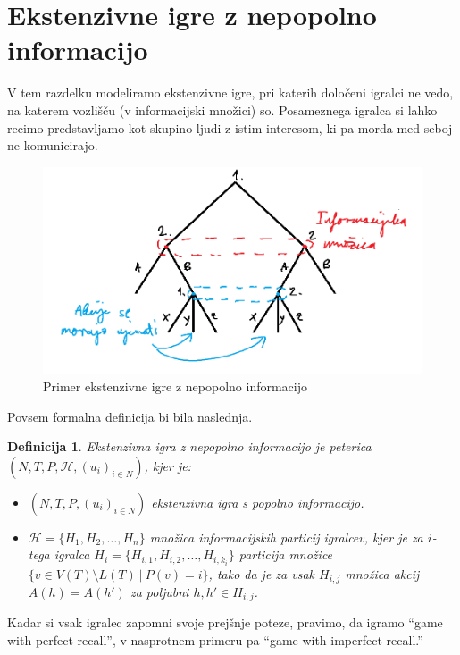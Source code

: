 \documentclass[10pt, a4paper]{article}
\newtheorem{defi}[izr]{Definicija}
\newenvironment{noticeB}{%
  \tcolorbox[%
  notitle,
  empty,
  enhanced,  %
  breakable,
  coltext=black,
  colback=white, 
  fontupper=\rmfamily,
  parbox=false,
  noparskip,
  sharp corners,
  boxrule=-1pt,  %
  frame hidden,
  left=7pt,  %
  right=7pt,
  top=5pt,
  bottom=5pt,
  before skip=2.5ex plus 2pt,
  after skip=2.5ex plus 2pt,
  borderline west = {1.5pt}{-0.1pt}{blue!30!black}, %
  overlay unbroken and last={%
    \draw[color=black, line width=1.25pt]
    ($(frame.south west)+(1.pt, -0.1pt)$) -- ++(2em, 0);
  }
  ]}
{\endtcolorbox}
\newenvironment{definicija}{\begin{defi}\begin{noticeB}}{%
    \end{noticeB}\end{defi}}
\begin{document}
\section{Ekstenzivne igre z nepopolno informacijo}

V tem razdelku modeliramo ekstenzivne igre, pri katerih
določeni igralci ne vedo, na katerem vozlišču (v informacijski množici) so.
Posameznega igralca si lahko recimo predstavljamo kot 
skupino ljudi z istim interesom, ki pa morda med seboj ne komunicirajo.
\begin{figure}[hbt!]
  \centering
  \includegraphics[scale=0.7]{drevo_8.png}
  \caption{Primer ekstenzivne igre z nepopolno informacijo}
\end{figure}
Povsem formalna definicija bi bila naslednja.

\begin{definicija}
  Ekstenzivna igra z nepopolno informacijo je peterica $(N, T, P, \mathcal{H}, (u_i)_{i \in N})$, kjer je:
  \begin{itemize}
    \item $(N, T, P, (u_i)_{i \in N})$ ekstenzivna igra s popolno informacijo.
    \item $\mathcal{H} = \{H_1, H_2, \dots, H_n\}$ množica informacijskih particij igralcev,
    kjer je za $i$-tega igralca $H_i = \{H_{i, 1}, H_{i, 2}, \dots, H_{i, k_i}\}$ particija množice $\{v \in V(T)\setminus L(T)\ |\ P(v) = i\}$,
    tako da je za vsak $H_{i, j}$ množica akcij $A(h) = A(h')$ za poljubni $h, h' \in H_{i, j}$.
  \end{itemize}
\end{definicija}

Kadar si vsak igralec zapomni svoje prejšnje poteze, pravimo, da igramo "`game with perfect recall"',
v nasprotnem primeru pa "`game with imperfect recall."'
\end{document}
